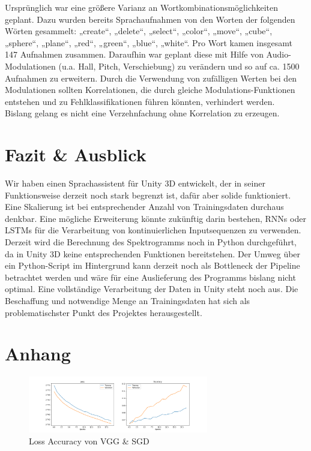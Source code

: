 \documentclass[sigconf]{acmart}
\begin{document}
\noindent Ursprünglich war eine größere Varianz an Wortkombinationsmöglichkeiten geplant. Dazu wurden bereits Sprachaufnahmen von den Worten der folgenden Wörten gesammelt: 
\newline
\newline
„create“, „delete“, „select“, „color“, „move“, „cube“, „sphere“, „plane“, „red“, „green“, „blue“, „white“. 
\newline
\newline
Pro Wort kamen insgesamt 147 Aufnahmen zusammen. Daraufhin war geplant diese mit Hilfe von Audio-Modulationen (u.a. Hall, Pitch, Verschiebung) zu verändern und so auf ca. 1500 Aufnahmen zu erweitern. Durch die Verwendung von zufälligen Werten bei den Modulationen sollten Korrelationen, die durch gleiche Modulations-Funktionen entstehen und zu Fehlklassifikationen führen könnten, verhindert werden.\\
Bislang gelang es nicht eine Verzehnfachung ohne Korrelation zu erzeugen.

\section{Fazit \& Ausblick}
Wir haben einen Sprachassistent für Unity 3D entwickelt, der in seiner Funktionsweise derzeit noch stark begrenzt ist, dafür aber solide funktioniert. Eine Skalierung ist bei entsprechender Anzahl von Trainingsdaten durchaus denkbar. Eine mögliche Erweiterung könnte zukünftig darin bestehen, RNNs oder LSTMs für die Verarbeitung von kontinuierlichen Inputsequenzen zu verwenden.
\newline
\newline
Derzeit wird die Berechnung des Spektrogramms noch in Python durchgeführt, da in Unity 3D keine entsprechenden Funktionen bereitstehen. Der Umweg über ein Python-Script im Hintergrund kann derzeit noch als Bottleneck der Pipeline betrachtet werden und wäre für eine Auslieferung des Programms bislang nicht optimal. Eine vollständige Verarbeitung der Daten in Unity steht noch aus. 
\newline
\newline
Die Beschaffung und notwendige Menge an Trainingsdaten hat sich als problematischster Punkt des Projektes herausgestellt.




\newpage
\onecolumn
\appendix
\section{Anhang}
\label{section:Anhang}
\begin{figure}[H]
  \includegraphics[width=0.7\textwidth]{images/Loss_Acc_VGG_SGD}
  \caption{Loss Accuracy von VGG \& SGD}
  \Description{}
  \label{fig:VGG_SGD}
\end{figure} 
\end{document}
